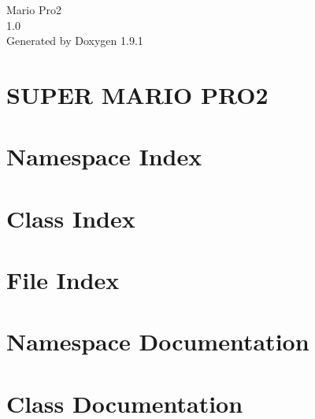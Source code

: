 \let\mypdfximage\pdfximage\def\pdfximage{\immediate\mypdfximage}\documentclass[twoside]{book}
\newcommand{\+}{\discretionary{\mbox{\scriptsize$\hookleftarrow$}}{}{}}
\newcommand{\clearemptydoublepage}{%
  \newpage{\pagestyle{empty}\cleardoublepage}%
}
\begin{document}
\raggedbottom

\hypersetup{pageanchor=false,
             bookmarksnumbered=true,
             pdfencoding=unicode
            }
\begin{titlepage}
\vspace*{7cm}
\begin{center}%
{\Large Mario Pro2 \\[1ex]\large 1.\+0 }\\
\vspace*{1cm}
{\large Generated by Doxygen 1.9.1}\\
\end{center}
\end{titlepage}
\clearemptydoublepage
{}
\tableofcontents
\clearemptydoublepage
{}
\hypersetup{pageanchor=true}

\chapter{SUPER MARIO PRO2}
\label{index}\hypertarget{index}{}
\chapter{Namespace Index}

\chapter{Class Index}

\chapter{File Index}

\chapter{Namespace Documentation}





\chapter{Class Documentation}
































\end{document}
